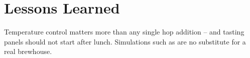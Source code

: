 \chapter{Lessons Learned}\label{lessons_learned}
Temperature control matters more than any single hop addition -- and tasting panels should not
start after lunch. Simulations such as  \citep{brewmaster} are no
substitute for a real brewhouse.
